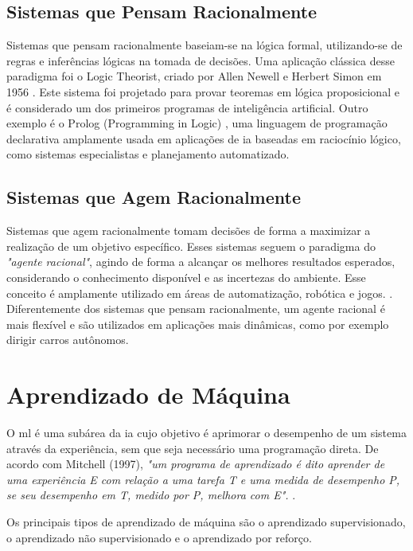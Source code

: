 \subsection{Sistemas que Pensam Racionalmente}\label{subsec:ia3}

Sistemas que pensam racionalmente baseiam-se na lógica formal, utilizando-se de regras e inferências lógicas na tomada de decisões. Uma aplicação clássica desse paradigma foi o Logic Theorist, criado por Allen Newell e Herbert Simon em 1956 \cite{NewellSimon1976}. Este sistema foi projetado para provar teoremas em lógica proposicional e é considerado um dos primeiros programas de inteligência artificial. Outro exemplo é o Prolog (Programming in Logic) \cite{Colmerauer1973}, uma linguagem de programação declarativa amplamente usada em aplicações de \gls{ia} baseadas em raciocínio lógico, como sistemas especialistas e planejamento automatizado.

\subsection{Sistemas que Agem Racionalmente}\label{subsec:ia4}

Sistemas que agem racionalmente tomam decisões de forma a maximizar a realização de um objetivo específico. Esses sistemas seguem o paradigma do \textit{"agente racional"}, agindo de forma a alcançar os melhores resultados esperados, considerando o conhecimento disponível e as incertezas do ambiente. Esse conceito é amplamente utilizado em áreas de automatização, robótica e jogos. \cite{Poole2010}. Diferentemente dos sistemas que pensam racionalmente, um agente racional é mais flexível e são utilizados em aplicações mais dinâmicas, como por exemplo dirigir carros autônomos.

\section{Aprendizado de Máquina}\label{subsec:ml}

O \gls{ml} é uma subárea da \gls{ia} cujo objetivo é aprimorar o desempenho de um sistema através da experiência, sem que seja necessário uma programação direta. De acordo com Mitchell (1997), \textit{"um programa de aprendizado é dito aprender de uma experiência E com relação a uma tarefa T e uma medida de desempenho P, se seu desempenho em T, medido por P, melhora com E".} \cite{Mitchell1997}. 

Os principais tipos de aprendizado de máquina são o aprendizado supervisionado, o aprendizado não supervisionado e o aprendizado por reforço. 

